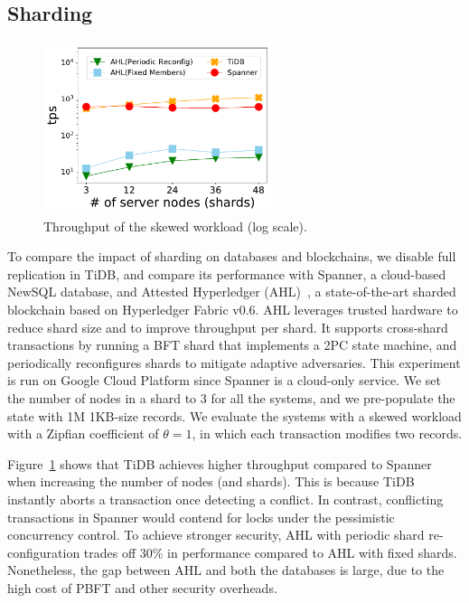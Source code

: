 \subsection{Sharding}
\label{ch:twin:exp:shard}

\begin{figure}[tp]

	\centering
	\includegraphics[width=0.6\textwidth]{chart/twin/skewed-scale.pdf}
	\caption{Throughput of the skewed workload (log scale).}
	\label{chart:twin:shard}
\end{figure}

To compare the impact of sharding on databases and blockchains, we disable full
replication in TiDB, and compare its performance with Spanner, a cloud-based
NewSQL database, and Attested Hyperledger (AHL)~\cite{dang2018towards}, a
state-of-the-art sharded blockchain based on Hyperledger Fabric v0.6.
AHL leverages trusted hardware to reduce shard size and to improve throughput
per shard.
It supports cross-shard transactions by running a BFT shard that implements a
2PC state machine, and periodically reconfigures shards to mitigate adaptive
adversaries.
This experiment is run on Google Cloud Platform since Spanner is a cloud-only
service.
We set the number of nodes in a shard to 3 for all the systems, and we
pre-populate the state with 1M 1KB-size records.
We evaluate the systems with a skewed workload with a Zipfian coefficient of
$\theta=1$, in which each transaction modifies two records.

Figure~\ref{chart:twin:shard} shows that TiDB achieves higher throughput compared to
Spanner when increasing the number of nodes (and shards).
This is because TiDB instantly aborts a transaction once detecting a conflict.
In contrast, conflicting transactions in Spanner would contend for locks under
the pessimistic concurrency control.
To achieve stronger security, AHL with periodic shard re-configuration trades
off $30\%$ in performance compared to AHL with fixed shards.
Nonetheless, the gap between AHL and both the databases is large, due to the
high cost of PBFT and other security overheads.


